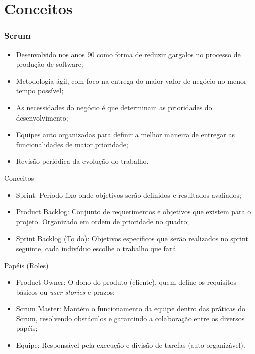 

\begin{frame}
\titlepage
\end{frame}


\section{Conceitos}

\begin{frame}
  \frametitle{Scrum}
  \begin{itemize}[<+->]
    \item Desenvolvido nos anos 90 como forma de reduzir gargalos no processo de produção de software;
    \item Metodologia ágil, com foco na entrega do maior valor de negócio no menor tempo possível;
    \item As necessidades do negócio é que determinam as prioridades do desenvolvimento;
    \item Equipes auto organizadas para definir a melhor maneira de entregar as funcionalidades de maior prioridade;
    \item Revisão periódica da evolução do trabalho.
  \end{itemize}
\end{frame}

\begin{frame}{Conceitos}
  \begin{itemize}[<+->]
    \item Sprint: Período fixo onde objetivos serão definidos e resultados avaliados;
    \item Product Backlog: Conjunto de requerimentos e objetivos que existem para o projeto. Organizado em ordem de prioridade no quadro;
    \item Sprint Backlog (To do): Objetivos específicos que serão realizados no sprint seguinte, cada indivíduo escolhe o trabalho que fará.
  \end{itemize}
\end{frame}

\begin{frame}{Papéis (Roles)}
  \begin{itemize}[<+->]
    \item Product Owner: O dono do produto (cliente), quem define os requisitos básicos ou \textit{user stories} e prazos;
    \item Scrum Master: Mantém o funcionamento da equipe dentro das práticas do Scrum, resolvendo obstáculos e garantindo a colaboração entre os diversos papéis;
    \item Equipe: Responsável pela execução e divisão de tarefas (auto organizável).
  \end{itemize}
\end{frame}

